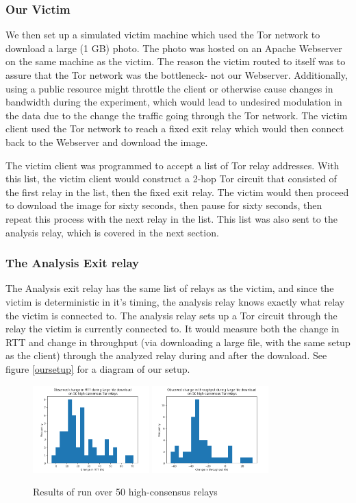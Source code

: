 \documentclass[12pt,journal]{IEEEtran}
\begin{document}
\subsubsection{Our Victim}We then set up a simulated victim machine which used the Tor network to download a large (1 GB) photo. The photo was hosted on an Apache Webserver on the same machine as the victim. The reason the victim routed to itself was to assure that the Tor network was the bottleneck- not our Webserver. Additionally, using a public resource might throttle the client or otherwise cause changes in bandwidth during the experiment, which would lead to undesired modulation in the data due to the change the traffic going through the Tor network. The victim client used the Tor network to reach a fixed exit relay which would then connect back to the Webserver and download the image.
\par
The victim client was programmed to accept a list of Tor relay addresses. With this list, the victim client would construct a 2-hop Tor circuit that consisted of the first relay in the list, then the fixed exit relay. The victim would then proceed to download the image for sixty seconds, then pause for sixty seconds, then repeat this process with the next relay in the list. This list was also sent to the analysis relay, which is covered in the next section.


\subsubsection{The Analysis Exit relay} The Analysis exit relay has the same list of relays as the victim, and since the victim is deterministic in it's timing, the analysis relay knows exactly what relay the victim is connected to. The analysis relay sets up a Tor circuit through the relay the victim is currently connected to. It would measure both the change in RTT and change in throughput (via downloading a large file, with the same setup as the client) through the analyzed relay during and after the download. See figure \ref{oursetup} for a diagram of our setup.

\begin{figure}
 \center
  \includegraphics[width=0.4\textwidth]{figures/rtt_guard.png}
  \includegraphics[width=0.4\textwidth]{figures/thr_guard.png}
  \caption{Results of run over 50 high-consensus relays}
  \label{AAA}
\end{figure}
\end{document}
